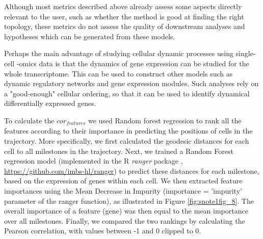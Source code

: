Although most metrics described above already assess some aspects directly relevant to the user, such as whether the method is good at finding the right topology, these metrics do not assess the quality of downstream analyses and hypotheses which can be generated from these models. 

Perhaps the main advantage of studying cellular dynamic processes using single-cell -omics data is that the dynamics of gene expression can be studied for the whole transcriptome. This can be used to construct other models such as dynamic regulatory networks and gene expression modules. Such analyses rely on a "good-enough" cellular ordering, so that it can be used to identify dynamical differentially expressed genes.

To calculate the $\textit{cor}_{\textit{features}}$ we used Random forest regression to rank all the features according to their importance in predicting the positions of cells in the trajectory. More specifically, we first calculated the geodesic distances for each cell to all milestones in the trajectory. Next, we trained a Random Forest regression model (implemented in the R \textit{ranger} package \cite{wright_rangerfastimplementation_2017}, \href{https://github.com/imbs-hl/ranger}{https://github.com/imbs-hl/ranger}) to predict these distances for each milestone, based on the expression of genes within each cell. We then extracted feature importances using the Mean Decrease in Impurity (importance = 'impurity' parameter of the ranger function), as illustrated in Figure \ref{fig:snote1fig_8}. The overall importance of a feature (gene) was then equal to the mean importance over all milestones. Finally, we compared the two rankings by calculating the Pearson correlation, with values between -1 and 0 clipped to 0.

